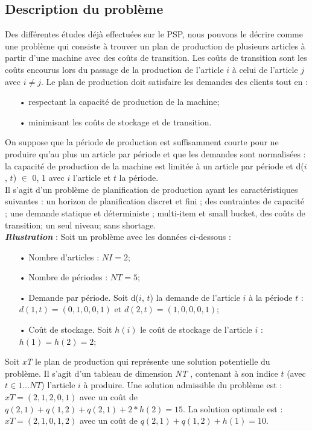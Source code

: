 	\subsection{Description du problème}

		\label{sec:problem_description}
		Des différentes études \cite{ratheil_master} \cite{ceschia} déjà effectuées sur le PSP, nous pouvons le décrire comme une problème qui consiste à trouver un plan de production de plusieurs articles à partir d’une machine avec des coûts de transition. Les coûts de transition sont les coûts encourus lors du passage de la production de l’article $i$ à celui de l’article $j$ avec $i \neq j$. Le plan de production doit satisfaire les demandes des clients tout en :
	\begin{itemize}
		\item[•] respectant la capacité de production de la machine;
		\item[•] minimisant les coûts de stockage et de transition.
	\end{itemize}
	\hspace*{.5cm} On suppose que la période de production est suffisamment courte pour ne produire qu’au plus un article par période et que les demandes sont normalisées : la capacité de production de la machine est limitée à un article par
période et d($i$, $t$) $ \in $ {0, 1} avec $i$ l’article et $t$ la période.\\
	\hspace*{.5cm} Il s’agit d’un problème de planification de production ayant les caractéristiques suivantes : un horizon de planification discret et fini ; des contraintes de capacité ; une demande statique et déterministe ; multi-item et small bucket, des coûts de transition; un seul niveau; sans shortage.\\

	\textbf{\textsl{Illustration}} : Soit un problème avec les données ci-dessous : \\
	\begin{itemize}
		\item[•] Nombre d’articles : $NI = 2$;
		\item[•] Nombre de périodes : $NT = 5$;
		\item[•] Demande par période. Soit d($i$, $t$) la demande de l’article $i$ à la période $t$ : $d(1, t) = (0, 1, 0, 0, 1)$ et $d(2, t) = (1, 0, 0, 0, 1)$;
		\item[•] Coût de stockage. Soit $h(i)$ le coût de stockage de l’article $i$ : $h(1) = h(2) = 2$;
	\end{itemize}
	Soit \emph{xT} le plan de production qui représente une solution potentielle du problème. Il s’agit d’un tableau de dimension \emph{NT} , contenant à son indice $t$ (avec $t  \in  {1...NT}$) l’article $i$ à produire. Une solution admissible du problème est : $ xT = (2, 1, 2, 0, 1)$ avec un coût de $ q(2, 1) + q(1, 2) + q(2, 1) + 2 * h(2) = 15 $. La solution optimale est : $ xT = (2, 1, 0, 1, 2)$ avec un coût de $q(2, 1) + q(1, 2) + h(1) = 10$.
		
